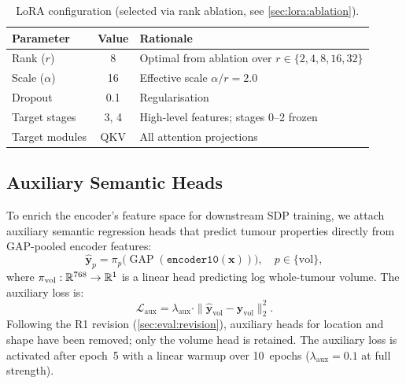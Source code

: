 \begin{table}[H]
  \centering
  \caption{LoRA configuration (selected via rank ablation, see
    \cref{sec:lora:ablation}).}
  \label{tab:lora_config}
  \begin{tabular}{lcp{7cm}}
    \toprule
    \textbf{Parameter} & \textbf{Value} & \textbf{Rationale} \\
    \midrule
    Rank ($r$) & 8 & Optimal from ablation over $r \in \{2, 4, 8, 16, 32\}$ \\
    Scale ($\alpha$) & 16 & Effective scale $\alpha/r = 2.0$ \\
    Dropout & 0.1 & Regularisation \\
    Target stages & 3, 4 & High-level features; stages 0--2 frozen \\
    Target modules & QKV & All attention projections \\
    \bottomrule
  \end{tabular}
\end{table}

\subsection{Auxiliary Semantic Heads}
\label{sec:lora:aux}

To enrich the encoder's feature space for downstream SDP training, we
attach auxiliary semantic regression heads that predict tumour properties
directly from GAP-pooled encoder features:
\begin{equation}
  \hat{\mathbf{y}}_p = \pi_p\bigl(\operatorname{GAP}(\texttt{encoder10}(\mathbf{x}))\bigr),
  \quad p \in \{\text{vol}\},
  \label{eq:aux_heads}
\end{equation}
where $\pi_{\text{vol}}: \mathbb{R}^{768} \to \mathbb{R}^{1}$ is a linear head predicting
log whole-tumour volume. The auxiliary loss is:
\begin{equation}
  \mathcal{L}_{\text{aux}} = \lambda_{\text{aux}} \cdot
    \|\hat{\mathbf{y}}_{\text{vol}} - \mathbf{y}_{\text{vol}}\|_2^2.
  \label{eq:aux_loss}
\end{equation}
Following the R1 revision (\cref{sec:eval:revision}), auxiliary heads for
location and shape have been removed; only the volume head is retained. The
auxiliary loss is activated after epoch~5 with a linear warmup over 10~epochs
($\lambda_{\text{aux}} = 0.1$ at full strength).

